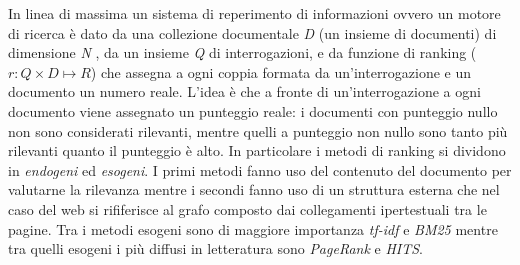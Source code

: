 In linea di massima un sistema di reperimento di informazioni ovvero un motore di ricerca è dato da una collezione documentale \textit{D} (un insieme di documenti) di dimensione \textit{N} , da un insieme \textit{Q} di interrogazioni, e da funzione di ranking (\(r : Q \times D \mapsto R\)) che
assegna a ogni coppia formata da un’interrogazione e un documento un numero reale. L’idea è che a fronte di un’interrogazione a ogni documento viene assegnato un punteggio reale: i documenti con punteggio nullo non sono considerati rilevanti, mentre quelli a punteggio non nullo sono tanto più rilevanti quanto il punteggio è alto. In particolare i metodi di ranking si dividono in \textit{endogeni} ed \textit{esogeni}. I primi metodi fanno uso del contenuto del documento per valutarne la rilevanza mentre i secondi fanno uso di un struttura esterna che nel caso del web si rififerisce al grafo composto dai collegamenti ipertestuali tra le pagine. Tra i metodi esogeni sono di maggiore importanza \textit{tf-idf} e \textit{BM25} mentre tra quelli esogeni i più diffusi in letteratura sono \textit{PageRank} e \textit{HITS}.

